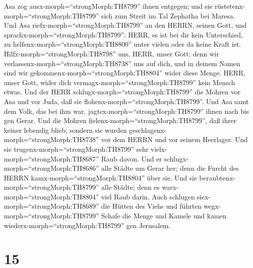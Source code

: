 Asa zog ausx-morph=``strongMorph:TH8799'' ihnen entgegen; und sie
rüstetenx-morph=``strongMorph:TH8799'' sich zum Streit im Tal Zephatha
bei Maresa.  Und Asa riefx-morph=``strongMorph:TH8799'' an
den HERRN, seinen Gott, und sprachx-morph=``strongMorph:TH8799'': HERR,
es ist bei dir kein Unterschied, zu helfenx-morph=``strongMorph:TH8800''
unter vielen oder da keine Kraft ist. Hilfx-morph=``strongMorph:TH8798''
uns, HERR, unser Gott; denn wir verlassenx-morph=``strongMorph:TH8738''
uns auf dich, und in deinem Namen sind wir
gekommenx-morph=``strongMorph:TH8804'' wider diese Menge. HERR, unser
Gott, wider dich vermagx-morph=``strongMorph:TH8799'' kein Mensch etwas.
 Und der HERR schlugx-morph=``strongMorph:TH8799'' die
Mohren vor Asa und vor Juda, daß sie
flohenx-morph=``strongMorph:TH8799''.  Und Asa samt dem
Volk, das bei ihm war, jagtex-morph=``strongMorph:TH8799'' ihnen nach
bis gen Gerar. Und die Mohren fielenx-morph=``strongMorph:TH8799'', daß
ihrer keiner lebendig blieb; sondern sie wurden
geschlagenx-morph=``strongMorph:TH8738'' vor dem HERRN und vor seinem
Heerlager. Und sie trugenx-morph=``strongMorph:TH8799'' sehr
vielx-morph=``strongMorph:TH8687'' Raub davon.  Und er
schlugx-morph=``strongMorph:TH8686'' alle Städte um Gerar her; denn die
Furcht des HERRN kamx-morph=``strongMorph:TH8804'' über sie. Und sie
beraubtenx-morph=``strongMorph:TH8799'' alle Städte; denn es
warx-morph=``strongMorph:TH8804'' viel Raub darin.  Auch
schlugen siex-morph=``strongMorph:TH8689'' die Hütten des Viehs und
führten wegx-morph=``strongMorph:TH8799'' Schafe die Menge und Kamele
und kamen wiederx-morph=``strongMorph:TH8799'' gen Jerusalem.

\hypertarget{section-14}{%
\section{15}\label{section-14}}

